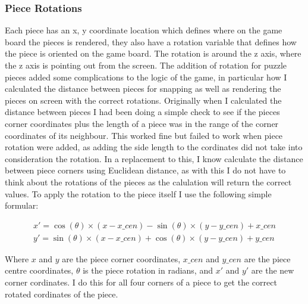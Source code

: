 \documentclass{article}
\begin{document}
\subsubsection{Piece Rotations}
Each piece has an x, y coordinate location which defines where on the game board
the pieces is rendered, they also have a rotation variable that defines how the
piece is oriented on the game board. The rotation is around the z axis, where
the z axis is pointing out from the screen. The addition of rotation for puzzle
pieces added some complications to the logic of the game, in particular how I
calculated the distance between pieces for snapping as well as rendering the
pieces on screen with the correct rotations. Originally when I calculated the
distance between pieces I had been doing a simple check to see if the pieces
corner coordinates plus the length of a piece was in the range of the corner
coordinates of its neighbour. This worked fine but failed to work when piece
rotation were added, as adding the side length to the cordinates did not take
into consideration the rotation. In a replacement to this, I know calculate the
distance between piece corners using Euclidean distance, as with this I do not
have to think about the rotations of the pieces as the calulation will return
the correct values. To apply the rotation to the piece itself I use the
following simple formular:

\begin{equation*}
\begin{aligned}
x' = \cos(\theta) \times (x - x\_cen) - \sin(\theta) \times (y - y\_cen) + x\_cen\\ 
y' = \sin(\theta) \times (x - x\_cen) + \cos(\theta) \times (y - y\_cen) + y\_cen
\end{aligned}
\end{equation*}

Where $x$ and $y$ are the piece corner coordinates, $x\_cen$ and $y\_cen$ are
the piece centre coordinates, $\theta$ is the piece rotation in radians, and
$x'$ and $y'$ are the new corner cordinates. I do this for all four corners of a
piece to get the correct rotated cordinates of the piece.

\end{document}

